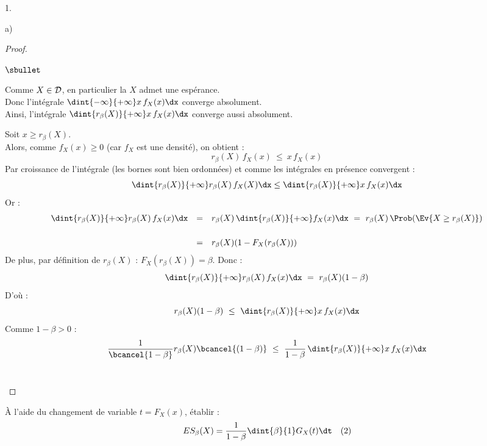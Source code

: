 \begin{noliste}{1.}
\begin{noliste}{a)}
    \begin{proof}~
      \begin{noliste}{$\sbullet$}
	\item Comme $X\in {\cal D}$, en particulier la \var $X$ 
	admet une espérance.\\
	Donc l'intégrale $\dint{-\infty}{+\infty} x \, f_X(x) \dx$
	converge absolument.\\
	Ainsi, l'intégrale $\dint{r_\beta(X)}{+\infty} x\, f_X(x) \dx$
	converge aussi absolument.
	
	
	\newpage
	
	
	\item Soit $x \geq r_\beta(X)$.\\
	Alors, comme $f_X(x) \geq 0$ (car $f_X$ est une densité), on 
	obtient :
	\[
	  r_\beta(X) \, f_X(x) \ \leq \ x \, f_X(x)
	\]
	Par croissance de l'intégrale (les bornes sont bien 
	ordonnées) et comme les intégrales en présence convergent :
	\[
	  \dint{r_\beta(X)}{+\infty} r_\beta(X) \, f_X(X) \dx
	  \leq \dint{r_\beta(X)}{+\infty} x\, f_X(x) \dx
	\]
	Or :
	\[
	\begin{array}{rcl}
	  \dint{r_\beta(X)}{+\infty} r_\beta(X) \, f_X(x) \dx
	  & = & r_\beta(X) \, \dint{r_\beta(X)}{+\infty} f_X(x) \dx
	  \ = \ r_\beta(X) \, \Prob(\Ev{X \geq r_\beta(X)})
	  \\[.6cm]
	  & = & r_\beta(X) (1-F_X(r_\beta(X)))
	\end{array}
	\]
	De plus, par définition de $r_\beta(X)$ : $F_X(r_\beta(X)) 
	=\beta$. Donc :
	\[
	  \dint{r_\beta(X)}{+\infty} r_\beta(X) \, f_X(x) \dx \ = \
	  r_\beta(X)(1-\beta)
	\]
	D'où :
	\[
	  r_\beta(X) (1-\beta) \ \leq \ \dint{r_\beta(X)}{+\infty}
	  x\, f_X(x) \dx
	\]
	Comme $1-\beta>0$ :
	\[
	  \dfrac{1}{\bcancel{1-\beta}} r_\beta(X) \bcancel{(1-\beta)}
	  \ \leq \ \dfrac{1}{1-\beta} \, \dint{r_\beta(X)}{+\infty}
	  x\, f_X(x) \dx
	\]
	~\\[-1.2cm]
      \end{noliste}
    \end{proof}
    
    \item À l'aide du changement de variable $t=F_X(x)$, établir :
    \[
      ES_\beta(X)=\dfrac{1}{1-\beta} \dint{\beta}{1} G_X(t) \dt 
      \quad (2)
    \]
    

\end{noliste}
\end{noliste}
